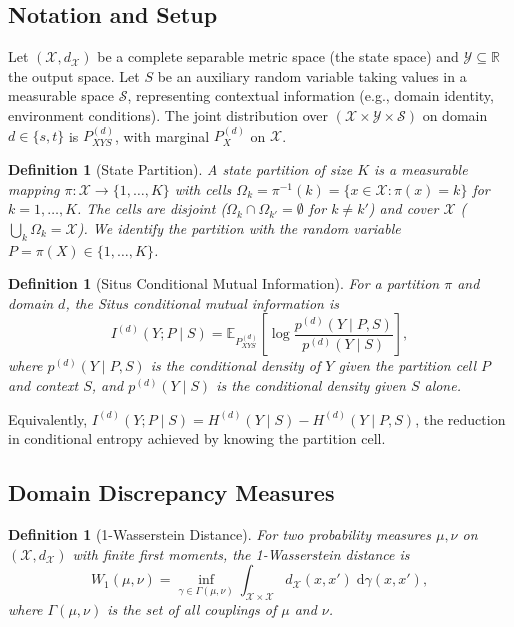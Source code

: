 \documentclass[12pt,a4paper]{article}
\newtheorem{definition}[theorem]{Definition}
\newcommand{\R}{\mathbb{R}}
\newcommand{\E}{\mathbb{E}}
\newcommand{\cX}{\mathcal{X}}
\newcommand{\cY}{\mathcal{Y}}
\newcommand{\cS}{\mathcal{S}}
\newcommand{\Wass}{W_1}
\begin{document}
\subsection{Notation and Setup}

Let $(\cX,d_{\cX})$ be a complete separable metric space (the state space)
and $\cY\subseteq\R$ the output space.  Let $S$ be an auxiliary random
variable taking values in a measurable space $\cS$, representing contextual
information (e.g., domain identity, environment conditions).  The joint
distribution over $(\cX\times\cY\times\cS)$ on domain $d\in\{s,t\}$ is
$P^{(d)}_{XYS}$, with marginal $P^{(d)}_X$ on $\cX$.

\begin{definition}[State Partition]
\label{def:partition}
A \emph{state partition} of size $K$ is a measurable mapping
$\pi:\cX\to\{1,\dots,K\}$ with cells
$\Omega_k = \pi^{-1}(k) = \{x\in\cX: \pi(x)=k\}$ for $k=1,\dots,K$.
The cells are disjoint ($\Omega_k\cap\Omega_{k'}=\emptyset$ for $k\neq k'$)
and cover $\cX$ ($\bigcup_k\Omega_k=\cX$).  We identify the partition with
the random variable $P=\pi(X)\in\{1,\dots,K\}$.
\end{definition}

\begin{definition}[Situs Conditional Mutual Information]
\label{def:situs-mi}
For a partition $\pi$ and domain $d$, the Situs conditional mutual
information is
\begin{equation}\label{eq:situs-mi}
    I^{(d)}(Y;P\mid S) =
    \E_{P^{(d)}_{XYS}}\!\left[
        \log\frac{p^{(d)}(Y\mid P,S)}
                  {p^{(d)}(Y\mid S)}
    \right],
\end{equation}
where $p^{(d)}(Y\mid P,S)$ is the conditional density of $Y$ given the
partition cell $P$ and context $S$, and $p^{(d)}(Y\mid S)$ is the
conditional density given $S$ alone.
\end{definition}

Equivalently, $I^{(d)}(Y;P\mid S)=H^{(d)}(Y\mid S)-H^{(d)}(Y\mid P,S)$,
the reduction in conditional entropy achieved by knowing the partition cell.

\subsection{Domain Discrepancy Measures}

\begin{definition}[1-Wasserstein Distance]
\label{def:wasserstein}
For two probability measures $\mu,\nu$ on $(\cX,d_{\cX})$ with finite first
moments, the 1-Wasserstein distance is
\begin{equation}\label{eq:w1}
    \Wass(\mu,\nu) =
    \inf_{\gamma\in\Gamma(\mu,\nu)}
    \int_{\cX\times\cX} d_{\cX}(x,x')\;\mathrm{d}\gamma(x,x'),
\end{equation}
where $\Gamma(\mu,\nu)$ is the set of all couplings of $\mu$ and $\nu$.
\end{definition}
\end{document}
